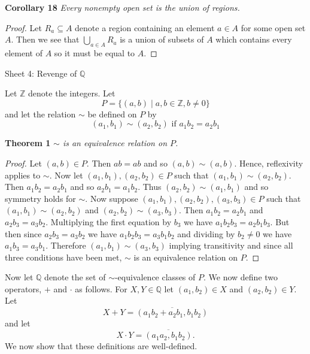 \documentclass{article}
\begin{document}
\begin{flushleft}
\textbf{Corollary 18}
\textsl{Every nonempty open set is the union of regions.}
\begin{proof}
Let $R_a \subseteq A$ denote a region containing an element $a \in A$ for some open set $A$. Then we see that $\bigcup_{a \in A} R_a$ is a union of subsets of $A$ which contains every element of $A$ so it must be equal to $A$.
\end{proof}
\newpage

\Large

Sheet 4: Revenge of $\mathbb{Q}$\newline

\normalsize

Let $\mathbb{Z}$ denote the integers. Let
\[
P = \{(a,b) \mid a,b \in \mathbb{Z}, b \neq 0\}
\]
and let the relation $\sim$ be defined on $P$ by
\[
(a_1,b_1) \sim (a_2,b_2) \text{ if } a_1b_2=a_2b_1
\]

\textbf{Theorem 1}
\textsl{$\sim$ is an equivalence relation on $P$.}
\begin{proof}
Let $(a,b) \in P$. Then $ab=ab$ and so $(a,b) \sim (a,b)$. Hence, reflexivity applies to $\sim$. Now let $(a_1,b_1), (a_2,b_2) \in P$ such that $(a_1,b_1) \sim (a_2,b_2)$. Then $a_1b_2=a_2b_1$ and so $a_2b_1=a_1b_2$. Thus $(a_2,b_2) \sim (a_1,b_1)$ and so symmetry holds for $\sim$. Now suppose $(a_1,b_1), (a_2,b_2), (a_3,b_3) \in P$ such that $(a_1,b_1) \sim (a_2,b_2)$ and $(a_2,b_2) \sim (a_3,b_3)$. Then $a_1b_2=a_2b_1$ and $a_2b_3=a_3b_2$. Multiplying the first equation by $b_3$ we have $a_1b_2b_3=a_2b_1b_3$. But then since $a_2b_3=a_3b_2$ we have $a_1b_2b_3=a_3b_1b_2$ and dividing by $b_2 \neq 0$ we have $a_1b_3=a_3b_1$. Therefore $(a_1,b_1) \sim (a_3,b_3)$ implying transitivity and since all three conditions have been met, $\sim$ is an equivalence relation on $P$.
\end{proof}

Now let $\mathbb{Q}$ denote the set of $\sim$-equivalence classes of $P$. We now define two operators, $+$ and $\cdot$ as follows. For $X,Y \in \mathbb{Q}$ let $(a_1,b_2) \in X$ and $(a_2,b_2) \in Y$. Let
\[
X + Y = \overline{(a_1b_2 + a_2b_1,b_1b_2)}
\]
and let
\[
X \cdot Y = \overline{(a_1a_2,b_1b_2)}.
\]
We now show that these definitions are well-defined.\newline


\end{flushleft}
\end{document}
